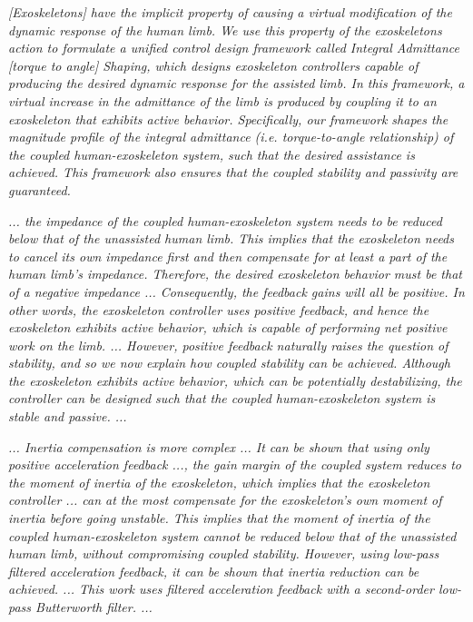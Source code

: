 \documentclass[letterpaper,12pt,fullpage]{article}
\begin{document}
{\it [Exoskeletons] have the implicit property
of causing a virtual modification of the dynamic response of
the human limb. We use this property of the exoskeletons
action to formulate a unified control design framework called
Integral Admittance [torque to angle] Shaping, which designs exoskeleton 
controllers capable of producing the desired dynamic response
for the assisted limb. In this framework, a virtual increase
in the admittance of the limb is produced by coupling it
to an exoskeleton that exhibits active behavior. Specifically,
our framework shapes the magnitude profile of the integral
admittance (i.e. torque-to-angle relationship) of the coupled
human-exoskeleton system, such that the desired assistance is
achieved. This framework also ensures that the coupled stability
and passivity are guaranteed.}

{\it ... the impedance of the coupled human-exoskeleton
system needs to be reduced below that of the unassisted
human limb. This implies that the exoskeleton needs to
cancel its own impedance first and then compensate for
at least a part of the human limb’s impedance. Therefore,
the desired exoskeleton behavior must be that of a negative
impedance ... Consequently,
the feedback gains will all be
positive. In other words, the exoskeleton controller uses
positive feedback, and hence the exoskeleton exhibits active
behavior, which is capable of performing net positive work
on the limb. ...
However, positive feedback naturally raises the question of
stability, and so we now explain how coupled stability can be
achieved. Although the exoskeleton exhibits active behavior,
which can be potentially destabilizing, the controller can be
designed such that the coupled human-exoskeleton system
is stable and passive. ... 
}

{\it
... Inertia compensation is more complex ...
It can be shown that using only positive acceleration
feedback ..., the gain margin of the coupled system
reduces to the moment of inertia of the exoskeleton, which
implies that the exoskeleton controller ... can at the most
compensate for the exoskeleton’s own moment of inertia
before going unstable. This implies that the moment of
inertia of the coupled human-exoskeleton system cannot be
reduced below that of the unassisted human limb, without
compromising coupled stability. However, using low-pass
filtered acceleration feedback, it can be shown that inertia 
reduction can be achieved. ...
This work uses filtered acceleration
feedback with a second-order low-pass Butterworth filter. ...
}
\end{document}
